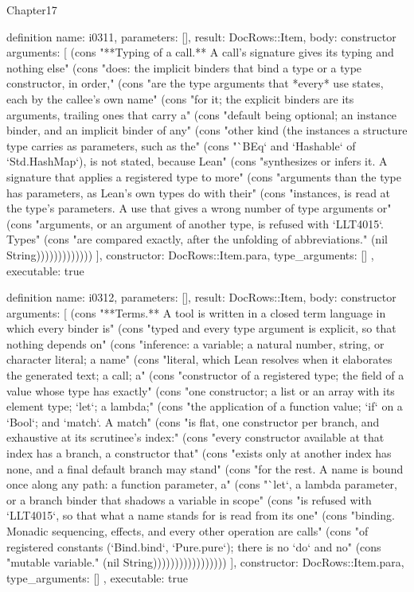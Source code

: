 \begin{lexlean}{Chapter17}
\begin{semanticmodule}
definition{
  name: i0311,
  parameters: [],
  result: DocRows::Item,
  body: constructor{
    arguments: [
      (cons "**Typing of a call.** A call's signature gives its typing and nothing else" (cons "does: the implicit binders that bind a type or a type constructor, in order," (cons "are the type arguments that *every* use states, each by the callee's own name" (cons "for it; the explicit binders are its arguments, trailing ones that carry a" (cons "default being optional; an instance binder, and an implicit binder of any" (cons "other kind (the instances a structure type carries as parameters, such as the" (cons "`BEq` and `Hashable` of `Std.HashMap`), is not stated, because Lean" (cons "synthesizes or infers it. A signature that applies a registered type to more" (cons "arguments than the type has parameters, as Lean's own types do with their" (cons "instances, is read at the type's parameters. A use that gives a wrong number of type arguments or" (cons "arguments, or an argument of another type, is refused with `LLT4015`. Types" (cons "are compared exactly, after the unfolding of abbreviations." (nil String)))))))))))))
    ],
    constructor: DocRows::Item.para,
    type_arguments: []
  },
  executable: true
}

definition{
  name: i0312,
  parameters: [],
  result: DocRows::Item,
  body: constructor{
    arguments: [
      (cons "**Terms.** A tool is written in a closed term language in which every binder is" (cons "typed and every type argument is explicit, so that nothing depends on" (cons "inference: a variable; a natural number, string, or character literal; a name" (cons "literal, which Lean resolves when it elaborates the generated text; a call; a" (cons "constructor of a registered type; the field of a value whose type has exactly" (cons "one constructor; a list or an array with its element type; `let`; a lambda;" (cons "the application of a function value; `if` on a `Bool`; and `match`. A match" (cons "is flat, one constructor per branch, and exhaustive at its scrutinee's index:" (cons "every constructor available at that index has a branch, a constructor that" (cons "exists only at another index has none, and a final default branch may stand" (cons "for the rest. A name is bound once along any path: a function parameter, a" (cons "`let`, a lambda parameter, or a branch binder that shadows a variable in scope" (cons "is refused with `LLT4015`, so that what a name stands for is read from its one" (cons "binding. Monadic sequencing, effects, and every other operation are calls" (cons "of registered constants (`Bind.bind`, `Pure.pure`); there is no `do` and no" (cons "mutable variable." (nil String)))))))))))))))))
    ],
    constructor: DocRows::Item.para,
    type_arguments: []
  },
  executable: true
}


\end{semanticmodule}
\end{lexlean}
